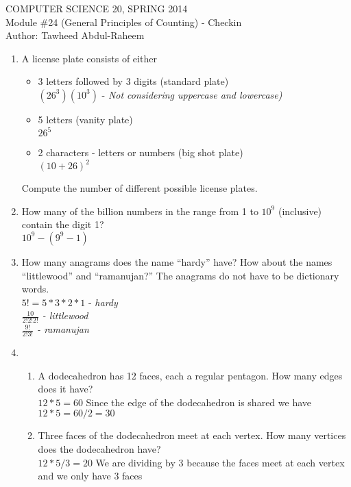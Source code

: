 \documentclass[12pt]{article}
\begin{document}
\begin{center}
COMPUTER SCIENCE 20, SPRING 2014 \\
Module \#24 (General Principles of Counting) - Checkin \\
Author: Tawheed Abdul-Raheem
\end{center}

\begin{enumerate}

\item A license plate consists of either 
\begin{itemize}
\item 3 letters followed by 3 digits (standard plate) \\
    $(26^{ 3 })(10^{ 3 })$ - \it{Not considering uppercase and lowercase)}
\item 5 letters (vanity plate) \\
    $26^5$
\item 2 characters - letters or numbers (big shot plate) \\
    $(10+26)^{ 2 }$
\end{itemize}
Compute the number of different possible license plates.

\item How many of the billion numbers in the range from 1 to $10^9$ (inclusive) contain the digit 1? \\
    $10^{9} - (9^{9} - 1)$

\item How many anagrams does the name ``hardy'' have? How about the names ``littlewood'' and ``ramanujan?'' The anagrams do not have to be dictionary words. \\
    $5! = 5 * 3 * 2 * 1$ - \it{hardy} \\

    $\frac{10}{2!2!2!}$ - \it{littlewood} \\

    $\frac{9!}{2!3!}$ - \it{ramanujan} \\

\item \begin{enumerate}
\item A dodecahedron has 12 faces, each a regular pentagon. How many edges does it have? \\
    $12*5=60$ Since the edge of the dodecahedron is shared we have $12*5=60/2=30$
\item Three faces of the dodecahedron meet at each vertex.  How many vertices does the dodecahedron have?\\
    $12*5/3=20$ We are dividing by 3 because the faces meet at each vertex and we only have 3 faces
\end{enumerate}
\end{enumerate}
\end{document}
